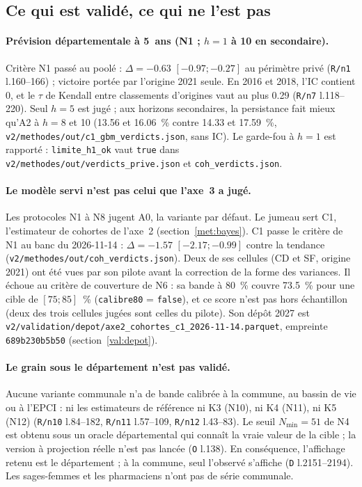 \subsection{Ce qui est validé, ce qui ne l'est pas}\label{val:perimetre}

\paragraph{Prévision départementale à 5~ans (N1 ; $h = 1$ à 10 en secondaire).} Critère N1 passé au
poolé : $\Delta = \num{-0.63}$ $[\num{-0.97} ; \num{-0.27}]$\mesure{} au périmètre privé (\texttt{R/n1}
l.160--166) ; victoire portée par l'origine 2021 seule. En 2016 et 2018, l'IC contient 0\mesure, et le
$\tau$ de Kendall entre classements d'origines vaut au plus \num{0.29}\mesure{} (\texttt{R/n7}
l.118--220). Seul $h = 5$ est jugé ; aux horizons secondaires, la persistance fait mieux qu'A2 à $h = 8$
et 10 (\num{13.56} et \num{16.06}\mesure{}~\% contre \num{14.33} et \num{17.59}\mesure{}~\%,
\texttt{v2/methodes/out/c1\_gbm\_verdicts.json}, sans IC). Le garde-fou à $h = 1$ est rapporté :
\texttt{limite\_h1\_ok} vaut \texttt{true} dans \texttt{v2/methodes/out/verdicts\_prive.json} et
\texttt{coh\_verdicts.json}.

\paragraph{Le modèle servi n'est pas celui que l'axe~3 a jugé.} Les protocoles N1 à N8 jugent A0, la
variante par défaut. Le jumeau sert C1, l'estimateur de cohortes de l'axe~2 (section~\ref{met:bayes}).
C1 passe le critère de N1 au banc du 2026-11-14 : $\Delta = \num{-1.57}$ $[\num{-2.17} ;
\num{-0.99}]$\mesure{} contre la tendance (\texttt{v2/methodes/out/coh\_verdicts.json}). Deux de ses
cellules (CD et SF, origine 2021) ont été vues par son pilote avant la correction de la forme des
variances. Il échoue au critère de couverture de N6 : sa bande à 80~\% couvre \num{73.5}\mesure{}~\%
pour une cible de $[75 ; 85]$\suppose{}~\% (\texttt{calibre80} = \texttt{false}), et ce score n'est pas
hors échantillon (deux des trois cellules jugées sont celles du pilote). Son dépôt 2027 est
\texttt{v2/\allowbreak validation/\allowbreak depot/\allowbreak axe2\_cohortes\_c1\_2026-11-14.parquet}, empreinte
\texttt{689b230b5b50} (section~\ref{val:depot}).

\paragraph{Le grain sous le département n'est pas validé.} Aucune variante communale n'a de bande
calibrée à la commune, au bassin de vie ou à l'EPCI : ni les estimateurs de référence ni K3
(N10), ni K4 (N11), ni K5 (N12) (\texttt{R/n10} l.84--182, \texttt{R/n11} l.57--109,
\texttt{R/n12} l.43--83). Le seuil $N_{\min} = 51$\mesure{} de N4 est obtenu sous un oracle
départemental qui connaît la vraie valeur de la cible ; la version à projection réelle n'est pas
lancée (\texttt{O} l.138). En conséquence, l'affichage retenu est le département ; à la commune,
seul l'observé s'affiche (\texttt{D} l.2151--2194). Les sages-femmes et les pharmaciens n'ont pas
de série communale.

